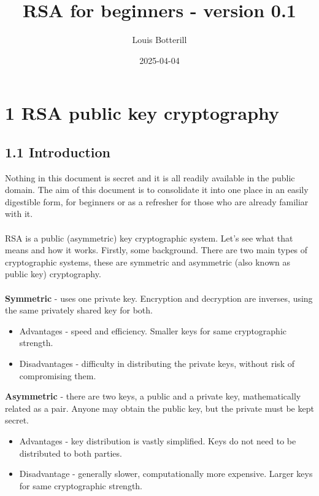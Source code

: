 \documentclass[11pt]{article}   	%
\title{RSA for beginners - version 0.1}
\author{Louis Botterill}
\date{2025-04-04}					%
\begin{document}
\maketitle

\pagebreak

\section*{1 RSA public key cryptography}

\subsection*{1.1 Introduction}

Nothing in this document is secret and it is all readily available in the public domain. The aim of this document is to consolidate it into one place in an easily digestible form, for beginners or as a refresher for those who are already familiar with it. \\
\\
RSA is a public (asymmetric) key cryptographic system. Let's see what that means and how it works.
Firstly, some background. There are two main types of cryptographic systems, these are symmetric and asymmetric (also known as public key) cryptography. \\
\\
\textbf{Symmetric} - uses one private key. Encryption and decryption are inverses, using the same privately shared key for both.
\begin{itemize}
 \item Advantages - speed and efficiency. Smaller keys for same cryptographic strength.
 \item Disadvantages - difficulty in distributing the private keys, without risk of compromising them.
\end{itemize}

\textbf{Asymmetric} - there are two keys, a public and a private key, mathematically related as a pair. Anyone may obtain the public key, but the private must be kept secret.
\begin{itemize}
 \item Advantages - key distribution is vastly simplified. Keys do not need to be distributed to both parties.
 \item Disadvantage - generally slower, computationally more expensive. Larger keys for same cryptographic strength.
\end{itemize}
\end{document}
